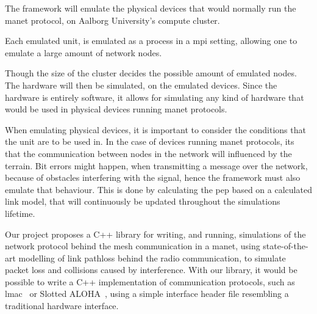 The framework will emulate the physical devices that would normally run the \gls{manet} protocol, on Aalborg University's compute cluster. 

Each emulated unit, is emulated as a process in a \gls{mpi} setting, allowing one to emulate a large amount of network nodes. 

Though the size of the cluster decides the possible amount of emulated nodes. 
The hardware will then be simulated, on the emulated devices. 
Since the hardware is entirely software, it allows for simulating any kind of hardware that would be used in physical devices running \gls{manet} protocols.\medbreak


When emulating physical devices, it is important to consider the conditions that the unit are to be used in. 
In the case of devices running \gls{manet} protocols, its that the communication between nodes in the network will influenced by the terrain. 
Bit errors might happen, when transmitting a message over the network, because of obstacles interfering with the signal, hence the framework must also emulate that behaviour.
This is done by calculating the \gls{pep} based on a calculated link model, that will continuously be updated throughout the simulations lifetime.





%
%
%
%
%

Our project proposes a C++ library for writing, and running, simulations of the network protocol behind the mesh communication in a \gls{manet}, using state-of-the-art modelling of link \gls{pathloss} behind the radio communication, to simulate packet loss and collisions caused by interference. With our library, it would be possible to write a C++ implementation of communication protocols, such as \gls{lmac}~\cite{paper:lmac_protocol} or Slotted ALOHA~\cite{Roberts:1975:APS:1024916.1024920}, using a simple interface header file resembling a traditional hardware interface.
